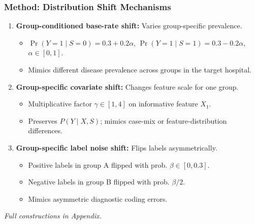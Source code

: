 \documentclass{beamer}
\begin{document}
\begin{frame}
\frametitle{Method: Distribution Shift Mechanisms}

\begin{enumerate}
    \item \textbf{Group-conditioned base-rate shift:} Varies group-specific prevalence.
    \small
    \begin{itemize}
        \item $\Pr(Y=1 \mid S=0) = 0.3 + 0.2\alpha$, $\Pr(Y=1 \mid S=1) = 0.3 - 0.2\alpha$, $\alpha \in [0,1]$.
        \item Mimics different disease prevalence across groups in the target hospital.
    \end{itemize}
    
    \item \textbf{Group-specific covariate shift:} Changes feature scale for one group.
    \begin{itemize}
        \item Multiplicative factor $\gamma \in [1,4]$ on informative feature $X_1$.
        \item Preserves $P(Y \mid X,S)$; mimics case-mix or feature-distribution differences.
    \end{itemize}
    
    \item \textbf{Group-specific label noise shift:} Flips labels asymmetrically.
    \begin{itemize}
        \item Positive labels in group A flipped with prob. $\beta \in [0,0.3]$.
        \item Negative labels in group B flipped with prob. $\beta/2$.
        \item Mimics asymmetric diagnostic coding errors.
    \end{itemize}
\end{enumerate}

\textit{Full constructions in Appendix.}

\end{frame}
\end{document}
